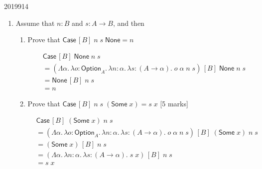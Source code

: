 \documentclass[10pt,\jkfside,a4paper]{article}
\newcommand{\answer}[1]{
    \begin{tcolorbox}[colframe=black, colback=white, sharp corners, boxrule=0.2mm, breakable]
        #1
    \end{tcolorbox}
}
\newcommand{\qmarks}[1]{\hspace*{\fill}[#1]}
\begin{document}
\begin{examquestion}{2019}{9}{14}
\begin{enumerate}
\begin{enumerate}
{\begin{enumerate}
                        \end{enumerate}
                    }

                \item
                    Assume that $n : B$ and $s : A \to B$, and then
                    \begin{enumerate}[label=(\Alph*)]
                        \item
                            Prove that $\mathsf{Case}\,[B]\;n\;s\;\mathsf{None} = n$

                            \answer{
                                \begin{align*}
                                    & \mathsf{Case}\,[B]\;\mathsf{None}\;n\;s \\
                                    &= (\Lambda\alpha.\, \lambda o{:}\mathsf{Option}_A.\, \lambda n{:}\alpha.\, \lambda s{:}(A \to \alpha).\; o\;\alpha\;n\;s)\,[B]\;\mathsf{None}\;n\;s \\
                                    &= \mathsf{None}\,[B]\;n\;s \\
                                    &= n
                                \end{align*}
                            }

                        \item
                            Prove that
                            $\mathsf{Case}\,[B]\;n\;s\;(\mathsf{Some}\;x) = s\;x$
                            \qmarks{5 marks}

                            \answer{
                                \begin{align*}
                                    & \mathsf{Case}\,[B]\;(\mathsf{Some}\;x)\;n\;s \\
                                    &= (\Lambda\alpha.\, \lambda o{:}\mathsf{Option}_A.\, \lambda n{:}\alpha.\, \lambda s{:}(A \to \alpha).\; o\;\alpha\;n\;s)\,[B]\;(\mathsf{Some}\;x)\;n\;s \\
                                    &= (\mathsf{Some}\;x)\,[B]\;n\;s \\
                                    &= (\Lambda\alpha.\, \lambda n{:}\alpha.\, \lambda s{:}(A \to \alpha).\; s\;x)\,[B]\;n\;s \\
                                    &= s\;x
                                \end{align*}
                            }


                    \end{enumerate}


\end{enumerate}
\end{enumerate}
\end{examquestion}
\end{document}
